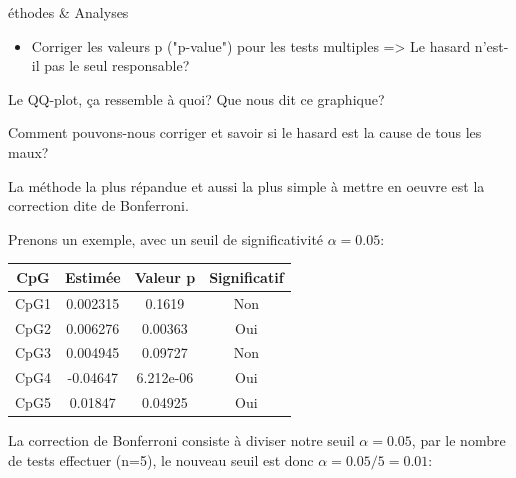 \begin{frame}[allowframebreaks]{éthodes \& Analyses}
\begin{itemize}
    \item Corriger les valeurs p ("p-value") pour les tests multiples => Le hasard n'est-il pas le seul responsable?
\end{itemize}
\framebreak
\par{Le QQ-plot, ça ressemble à quoi? Que nous dit ce graphique?}
\begin{center}
\end{center}
\framebreak
\par{Comment pouvons-nous corriger et savoir si le hasard est la cause de tous les maux?}
\vspace{1cm}
\par{La méthode la plus répandue et aussi la plus simple à mettre en oeuvre est la correction dite de Bonferroni.}
\framebreak
\par{Prenons un exemple, avec un seuil de significativité $\alpha=0.05$:}
\begin{center}
    \begin{tabular}{cccc}
        \hline
        CpG & Estimée & Valeur p & Significatif\\
        \hline
        CpG1 & 0.002315 & 0.1619 & Non\\
        CpG2 & 0.006276 & 0.00363 & Oui\\
        CpG3 & 0.004945 & 0.09727 & Non\\
        CpG4 & -0.04647 & 6.212e-06 & Oui\\
        CpG5 & 0.01847 & 0.04925 & Oui\\
        \hline
    \end{tabular}
\end{center}
\framebreak
\par{La correction de Bonferroni consiste à diviser notre seuil $\alpha=0.05$, par le nombre de tests effectuer (n=5), le nouveau seuil est donc $\alpha=0.05/5=0.01$:}
\begin{center}
    \begin{tabular}{cccc}

\end{tabular}
\end{center}
\end{frame}
